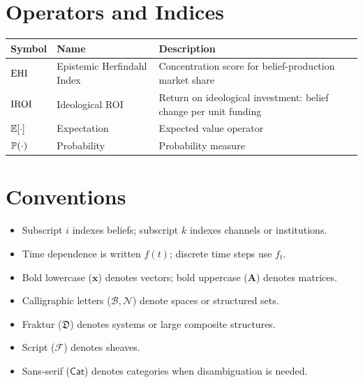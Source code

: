 \section*{Operators and Indices}

\begin{longtable}{>{\raggedright}p{3cm} p{4cm} p{6.5cm}}
\toprule
\textbf{Symbol} & \textbf{Name} & \textbf{Description} \\
\midrule
\endhead
$\mathrm{EHI}$ & Epistemic Herfindahl Index & Concentration score for belief-production market share \\
$\mathrm{IROI}$ & Ideological ROI & Return on ideological investment: belief change per unit funding \\
$\mathbb{E}[\cdot]$ & Expectation & Expected value operator \\
$\mathbb{P}(\cdot)$ & Probability & Probability measure \\
\bottomrule
\end{longtable}

\section*{Conventions}

\begin{itemize}[nosep]
  \item Subscript $i$ indexes beliefs; subscript $k$ indexes channels or institutions.
  \item Time dependence is written $f(t)$; discrete time steps use $f_t$.
  \item Bold lowercase ($\bm{x}$) denotes vectors; bold uppercase ($\bm{A}$) denotes matrices.
  \item Calligraphic letters ($\mathcal{B}, \mathcal{N}$) denote spaces or structured sets.
  \item Fraktur ($\mathfrak{D}$) denotes systems or large composite structures.
  \item Script ($\mathscr{F}$) denotes sheaves.
  \item Sans-serif ($\mathsf{Cat}$) denotes categories when disambiguation is needed.
\end{itemize}
